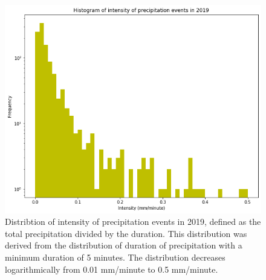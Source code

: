 
	\vfill 
	\begin{figure}[h]
		\centering
		\includegraphics[width=150mm]{../Figures/intensity_hist_5min.png}
		\caption{Distribtion of intensity of precipitation events in 2019, defined as the total precipitation divided by the duration. This distribution was derived from the distribution of duration of precipitation with a minimum duration of 5 minutes. The distribution decreases logarithmically from 0.01 mm/minute to 0.5 mm/minute.}
	\end{figure}
\vfill
